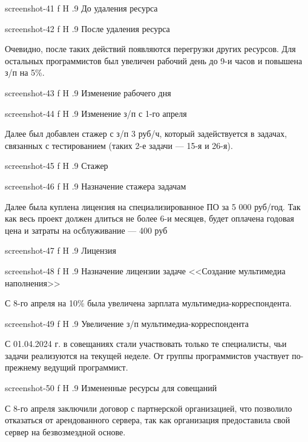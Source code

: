 \documentclass{bmstu}
\begin{document}
    {screenshot-41}
    {f}
    {H}
    {.9\textwidth}
    {До удаления ресурса}
    
    {screenshot-42}
    {f}
    {H}
    {.9\textwidth}
    {После удаления ресурса}
    
Очевидно, после таких действий появляются перегрузки других ресурсов. 
Для остальных программистов был увеличен рабочий день до 9-и часов и повышена з/п на 5\%.

    {screenshot-43}
    {f}
    {H}
    {.9\textwidth}
    {Изменение рабочего дня}

    {screenshot-44}
    {f}
    {H}
    {.9\textwidth}
    {Изменение з/п с 1-го апреля}
    
Далее был добавлен стажер с з/п 3 руб/ч, который задействуется в задачах, связанных с тестированием (таких 2-е задачи --- 15-я и 26-я).

    {screenshot-45}
    {f}
    {H}
    {.9\textwidth}
    {Стажер}

    {screenshot-46}
    {f}
    {H}
    {.9\textwidth}
    {Назначение стажера задачам}
    
Далее была куплена лицензия на специализированное ПО за 5 000 руб/год. 
Так как весь проект должен длиться не более 6-и месяцев, будет оплачена годовая цена и затраты на осблуживание --- 400 руб

    {screenshot-47}
    {f}
    {H}
    {.9\textwidth}
    {Лицензия}

    {screenshot-48}
    {f}
    {H}
    {.9\textwidth}
    {Назначение лицензии задаче <<Создание мультимедиа наполнения>>}
    
С 8-го апреля на 10\% была увеличена зарплата мультимедиа-корреспондента.

    {screenshot-49}
    {f}
    {H}
    {.9\textwidth}
    {Увеличение з/п мультимедиа-корреспондента}
    
С 01.04.2024 г. в совещаниях стали участвовать только те специалисты, чьи задачи реализуются на текущей неделе. 
От группы программистов участвует по-прежнему ведущий программист.

    {screenshot-50}
    {f}
    {H}
    {.9\textwidth}
    {Измененные ресурсы для совещаний}
    
С 8-го апреля заключили договор с партнерской организацией, что позволило отказаться от арендованного сервера, так как организация предоставила свой сервер на безвозмездной основе.
\end{document}
